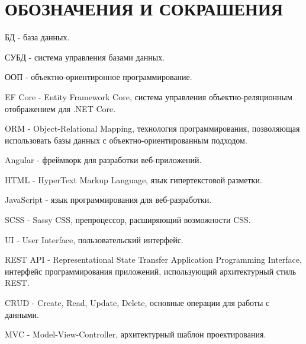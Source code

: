 \section*{ОБОЗНАЧЕНИЯ И СОКРАШЕНИЯ}

БД -\- база данных.

СУБД -\- система управления базами данных.

ООП -\- объектно-ориентиронное программирование.

EF Core -\- Entity Framework Core, система управления объектно-реляционным отображением для .NET Core.

ORM -\- Object-Relational Mapping, технология программирования, позволяющая использовать базы данных с объектно-ориентированным подходом.

Angular -\- фреймворк для разработки веб-приложений.

HTML -\- HyperText Markup Language, язык гипертекстовой разметки.

JavaScript -\- язык программирования для веб-разработки.

SCSS -\- Sassy CSS, препроцессор, расширяющий возможности CSS.

UI -\- User Interface, пользовательский интерфейс.

REST API -\- Representational State Transfer Application Programming Interface, интерфейс программирования приложений, использующий архитектурный стиль REST.

CRUD -\- Create, Read, Update, Delete, основные операции для работы с данными.

MVC -\- Model-View-Controller, архитектурный шаблон проектирования.